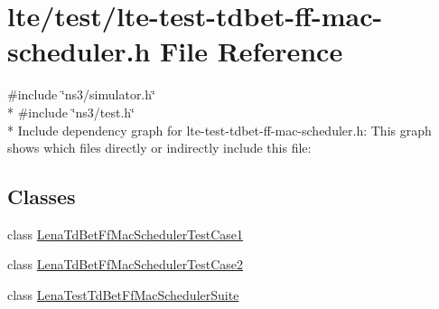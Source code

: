 \hypertarget{lte-test-tdbet-ff-mac-scheduler_8h}{}\section{lte/test/lte-\/test-\/tdbet-\/ff-\/mac-\/scheduler.h File Reference}
\label{lte-test-tdbet-ff-mac-scheduler_8h}
{\ttfamily \#include \char`\"{}ns3/simulator.\+h\char`\"{}}\\*
{\ttfamily \#include \char`\"{}ns3/test.\+h\char`\"{}}\\*
Include dependency graph for lte-\/test-\/tdbet-\/ff-\/mac-\/scheduler.h\+:
This graph shows which files directly or indirectly include this file\+:
\subsection*{Classes}
\begin{DoxyCompactItemize}
\item 
class \hyperlink{classLenaTdBetFfMacSchedulerTestCase1}{Lena\+Td\+Bet\+Ff\+Mac\+Scheduler\+Test\+Case1}
\item 
class \hyperlink{classLenaTdBetFfMacSchedulerTestCase2}{Lena\+Td\+Bet\+Ff\+Mac\+Scheduler\+Test\+Case2}
\item 
class \hyperlink{classLenaTestTdBetFfMacSchedulerSuite}{Lena\+Test\+Td\+Bet\+Ff\+Mac\+Scheduler\+Suite}
\end{DoxyCompactItemize}
